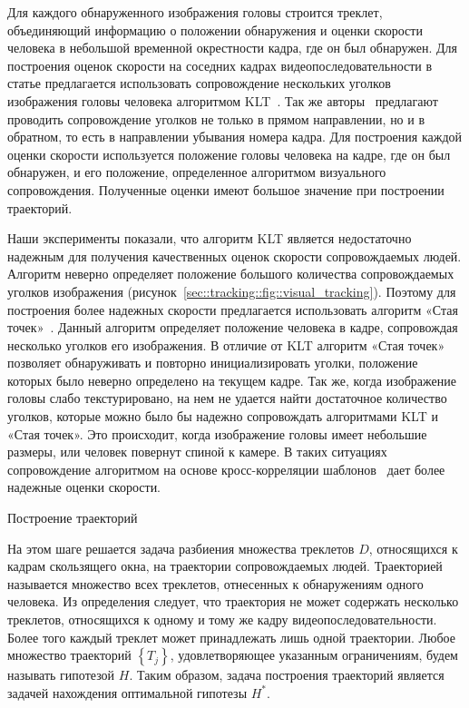 Для каждого обнаруженного изображения головы строится треклет, объединяющий информацию о положении обнаружения и оценки скорости человека в небольшой временной окрестности кадра, где он был обнаружен. Для построения оценок скорости на соседних кадрах видеопоследовательности в статье \cite{benfold2011stable} предлагается использовать сопровождение нескольких уголков \cite{shi1994good} изображения головы человека алгоритмом KLT~\cite{tomasi1991detection}. Так же авторы~\cite{benfold2011stable} предлагают проводить сопровождение уголков не только в прямом направлении, но и в обратном, то есть в направлении убывания номера кадра. Для построения каждой оценки скорости используется положение головы человека на кадре, где он был обнаружен, и его положение, определенное алгоритмом визуального сопровождения. Полученные оценки имеют большое значение при построении траекторий.

Наши эксперименты показали, что алгоритм KLT является недостаточно надежным для получения качественных оценок скорости сопровождаемых людей. Алгоритм неверно определяет положение большого количества сопровождаемых уголков изображения (рисунок~\ref{sec::tracking::fig::visual_tracking}). Поэтому для построения более надежных скорости предлагается использовать алгоритм «Стая точек»~\cite{kolsch2004fast}. Данный алгоритм определяет положение человека в кадре, сопровождая несколько уголков его изображения. В отличие от KLT алгоритм «Стая точек» позволяет обнаруживать и повторно инициализировать уголки, положение которых было неверно определено на текущем кадре. Так же, когда изображение головы слабо текстурировано, на нем не удается найти достаточное количество уголков, которые можно было бы надежно сопровождать алгоритмами KLT и «Стая точек». Это происходит, когда изображение головы имеет небольшие размеры, или человек повернут спиной к камере. В таких ситуациях сопровождение алгоритмом на основе кросс-корреляции шаблонов~\cite{freeman1998computer} дает более надежные оценки скорости.

Построение траекторий

На этом шаге решается задача разбиения множества треклетов $D$, относящихся к кадрам скользящего окна, на траектории сопровождаемых людей. Траекторией называется множество всех треклетов, отнесенных к обнаружениям одного человека. Из определения следует, что траектория не может содержать несколько треклетов, относящихся к одному и тому же кадру видеопоследовательности. Более того каждый треклет может принадлежать лишь одной траектории. Любое множество траекторий $\left\{T_j\right\}$, удовлетворяющее указанным ограничениям, будем называть гипотезой $H$. Таким образом, задача построения траекторий является задачей нахождения оптимальной гипотезы $H^*$.

